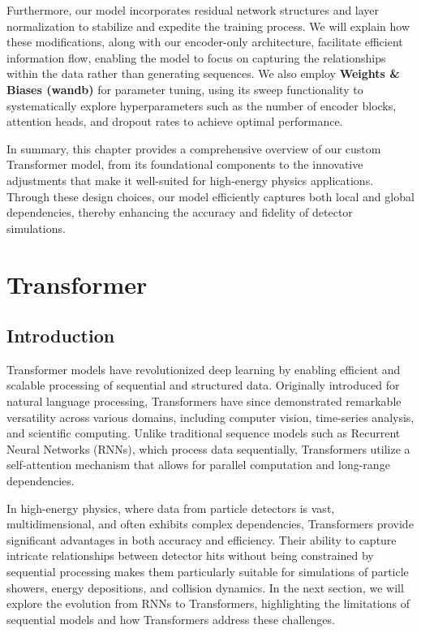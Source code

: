 Furthermore, our model incorporates residual network structures and layer normalization to stabilize and expedite the training process. We will explain how these modifications, along with our encoder-only architecture, facilitate efficient information flow, enabling the model to focus on capturing the relationships within the data rather than generating sequences. We also employ \textbf{Weights \& Biases (wandb)} for parameter tuning, using its sweep functionality to systematically explore hyperparameters such as the number of encoder blocks, attention heads, and dropout rates to achieve optimal performance.

In summary, this chapter provides a comprehensive overview of our custom Transformer model, from its foundational components to the innovative adjustments that make it well-suited for high-energy physics applications. Through these design choices, our model efficiently captures both local and global dependencies, thereby enhancing the accuracy and fidelity of detector simulations.

\section{Transformer}

\subsection{Introduction}

Transformer models have revolutionized deep learning by enabling efficient and scalable processing of sequential and structured data. Originally introduced for natural language processing, Transformers have since demonstrated remarkable versatility across various domains, including computer vision, time-series analysis, and scientific computing. Unlike traditional sequence models such as Recurrent Neural Networks (RNNs), which process data sequentially, Transformers utilize a self-attention mechanism that allows for parallel computation and long-range dependencies.

In high-energy physics, where data from particle detectors is vast, multidimensional, and often exhibits complex dependencies, Transformers provide significant advantages in both accuracy and efficiency. Their ability to capture intricate relationships between detector hits without being constrained by sequential processing makes them particularly suitable for simulations of particle showers, energy depositions, and collision dynamics. In the next section, we will explore the evolution from RNNs to Transformers, highlighting the limitations of sequential models and how Transformers address these challenges.

